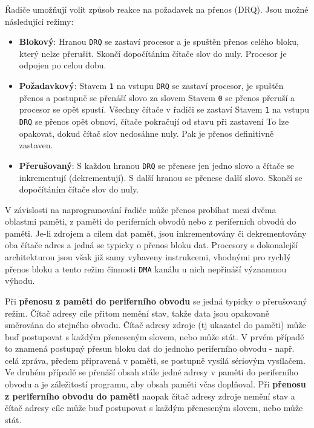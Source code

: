       Řadiče umožňují volit způsob reakce na požadavek na přenos (DRQ). Jsou možné následující režimy:
      \begin{itemize}\addtolength{\itemsep}{-0.5\baselineskip}
        \item \textbf{Blokový}:  Hranou \texttt{DRQ} se zastaví procesor a je spuštěn přenos celého
              bloku, který nelze přerušit. Skončí dopočítáním čítače slov do nuly. Procesor je 
              odpojen po celou dobu.
        \item \textbf{Požadavkový}: Stavem \texttt{1} na vstupu \texttt{DRQ} se zastaví 
              procesor, je spuštěn přenos a postupně se přenáší slovo za slovem Stavem \texttt{0} 
              se přenos přeruší a procesor se opět spustí. Všechny čítače v řadiči se zastaví 
              Stavem \texttt{1} na vstupu \texttt{DRQ} se přenos opět obnoví, čítače pokračují od 
              stavu při zastavení To lze opakovat, dokud čítač slov nedosáhne nuly. Pak je přenos 
              definitivně zastaven.
        \item \textbf{Přerušovaný}: S každou hranou \texttt{DRQ} se přenese jen jedno slovo a čítače
              se inkrementují (dekrementují). S další hranou se přenese další slovo. Skončí se 
              dopočítáním čítače slov do nuly.
      \end{itemize}
      
      V závislosti na naprogramování řadiče může přenos probíhat mezi dvěma oblastmi paměti, z 
      paměti do periferních obvodů nebo z periferních obvodů do paměti. Je-li zdrojem a cílem dat 
      paměť, jsou inkrementovány či dekrementovány oba čítače adres a jedná se typicky o přenos 
      bloku dat. Procesory s dokonalejší architekturou jsou však již samy vybaveny instrukcemi, 
      vhodnými pro rychlý přenos bloku a tento režim činnosti \texttt{DMA} kanálu u nich nepřináší 
      významnou výhodu.
      
      Při \textbf{přenosu z paměti do periferního obvodu} se jedná typicky o přerušovaný režim. 
      Čítač adresy cíle přitom nemění stav, takže data jsou opakovaně směrována do stejného obvodu. 
      Čítač adresy zdroje (tj ukazatel do paměti) může buď postupovat s každým přeneseným slovem, 
      nebo může stát. V prvém případě to znamená postupný přesun bloku dat do jednoho periferního 
      obvodu - např. celá zpráva, předem připravená v paměti, se postupně vysílá sériovým 
      vysílačem. Ve druhém případě se přenáší obsah stále jedné adresy v paměti do periferního 
      obvodu a je záležitostí programu, aby obsah paměti včas doplňoval. Při \textbf{přenosu z 
      periferního obvodu do paměti} naopak čítač adresy zdroje nemění stav a čítač adresy cíle může 
      buď postupovat s každým přeneseným slovem, nebo může stát.
      
